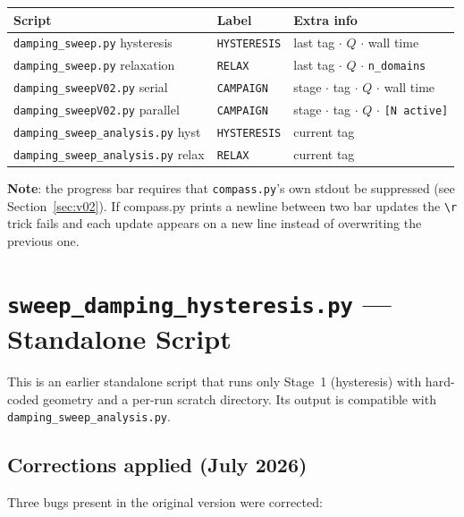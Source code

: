\documentclass[11pt,a4paper]{article}
\newcommand{\file}[1]{\texttt{#1}}
\newcommand{\warn}[1]{\textcolor{warnorange}{\textbf{#1}}}
\begin{document}
\begin{center}
\begin{tabular}{lll}
\toprule
Script & Label & Extra info \\
\midrule
\file{damping\_sweep.py} hysteresis & \texttt{HYSTERESIS} & last tag $\cdot$ $Q$ $\cdot$ wall time \\
\file{damping\_sweep.py} relaxation & \texttt{RELAX} & last tag $\cdot$ $Q$ $\cdot$ \texttt{n\_domains} \\
\file{damping\_sweepV02.py} serial & \texttt{CAMPAIGN} & stage $\cdot$ tag $\cdot$ $Q$ $\cdot$ wall time \\
\file{damping\_sweepV02.py} parallel & \texttt{CAMPAIGN} & stage $\cdot$ tag $\cdot$ $Q$ $\cdot$ \texttt{[N active]} \\
\file{damping\_sweep\_analysis.py} hyst & \texttt{HYSTERESIS} & current tag \\
\file{damping\_sweep\_analysis.py} relax & \texttt{RELAX} & current tag \\
\bottomrule
\end{tabular}
\end{center}

\warn{Note}: the progress bar requires that \texttt{compass.py}'s own stdout
be suppressed (see Section~\ref{sec:v02}).  If compass.py prints
a newline between two bar updates the \texttt{\textbackslash r} trick fails
and each update appears on a new line instead of overwriting the previous one.

\section{\texttt{sweep\_damping\_hysteresis.py} --- Standalone Script}
\label{sec:standalone}

This is an earlier standalone script that runs only Stage~1 (hysteresis) with
hard-coded geometry and a per-run scratch directory.  Its output is compatible
with \file{damping\_sweep\_analysis.py}.

\subsection{Corrections applied (July 2026)}

Three bugs present in the original version were corrected:
\end{document}
